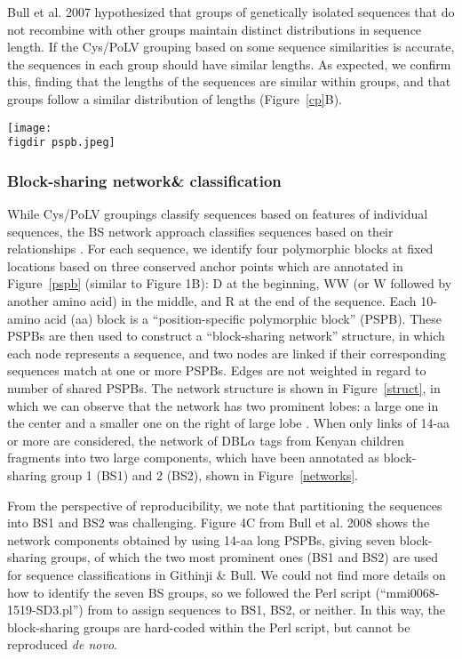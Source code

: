 \documentclass[10pt,twocolumn,superscriptaddress]{revtex4-1}
\newcommand{\dbla}{{DBL$\alpha$}\xspace}
\newcommand{\cp}{{Cys/PoLV}\xspace}
\newcommand{\paper}{{Githinji \& Bull}\xspace}
\newcommand{\figdir}{figures/}
\begin{document}
Bull et al. 2007 \cite{bull2007} hypothesized that groups of genetically isolated sequences that do not recombine with other groups maintain distinct distributions in sequence length. If the \cp grouping based on some sequence similarities is accurate, the sequences in each group should have similar lengths. As expected, we confirm this, finding that the lengths of the sequences are similar within groups, and that groups follow a similar distribution of lengths (Figure~\ref{cp}B).   


\begin{figure*}[t]
	\centering
	\texttt{[image: \\figdir pspb.jpeg]}
	\caption{{\bf Position specific polymorphic blocks (PSPBs)}. Four polymorphic blocks (purple) for four example tag sequences at fixed locations based on three conserved anchor points shaded in orange. }
	\label{pspb}
\end{figure*}

\subsubsection{Block-sharing network\& classification}

While \cp groupings classify sequences based on features of individual sequences, the BS network approach classifies sequences based on their relationships \cite{bull2008}. For each sequence, we identify four polymorphic blocks at fixed locations based on three conserved anchor points which are annotated in Figure~\ref{pspb} (similar to \cite{bull2008} Figure 1B): D at the beginning, WW (or W followed by another amino acid) in the middle, and R at the end of the sequence. Each 10-amino acid (aa) block is a ``position-specific polymorphic block'' (PSPB). These PSPBs are then used to construct a ``block-sharing network'' structure, in which each node represents a sequence, and two nodes are linked if their corresponding sequences match at one or more PSPBs. Edges are not weighted in regard to number of shared PSPBs. The network structure is shown in Figure~\ref{struct}, in which we can observe that the network has two prominent lobes: a large one in the center and a smaller one on the right of large lobe \cite{bull2008} \cite{githinji2017}. When only links of 14-aa or more are considered, the network of \dbla tags from Kenyan children \cite{bull2008} fragments into two large components, which have been annotated as block-sharing group 1 (BS1) and 2 (BS2), shown in Figure~\ref{networks}.  

From the perspective of reproducibility, we note that partitioning the sequences into BS1 and BS2 was challenging. Figure 4C from Bull et al. 2008 \cite{bull2008} shows the network components obtained by using 14-aa long PSPBs, giving seven block-sharing groups, of which the two most prominent ones (BS1 and BS2) are used for sequence classifications in \paper. We could not find more details on how to identify the seven BS groups, so we followed the Perl script (``mmi0068-1519-SD3.pl'') from \cite{bull2008} to assign sequences to BS1, BS2, or neither. In this way, the block-sharing groups are hard-coded within the Perl script, but cannot be reproduced \textit{de novo}.  
\end{document}
